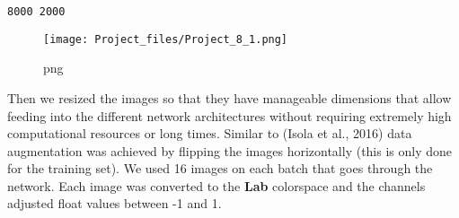 \documentclass[
]{article}
\begin{document}
\begin{verbatim}
8000 2000
\end{verbatim}

\begin{figure}
\centering
\texttt{[image: Project\_files/Project\_8\_1.png]}
\caption{png}
\end{figure}

Then we resized the images so that they have manageable dimensions that
allow feeding into the different network architectures without requiring
extremely high computational resources or long times. Similar to (Isola
et al., 2016) data augmentation was achieved by flipping the images
horizontally (this is only done for the training set). We used 16 images
on each batch that goes through the network. Each image was converted to
the \textbf{Lab} colorspace and the channels adjusted float values
between -1 and 1.
\end{document}
